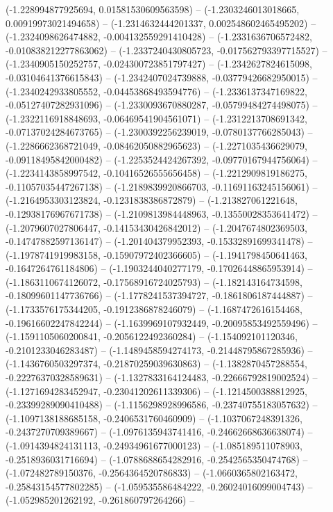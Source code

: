 \begin{scope}[blend group = overlay]
(-1.228994877925694, 0.01581530609563598) -- 
(-1.2303246013018665, 0.00919973021494658) -- 
(-1.2314632444201337, 0.002548602465495202) -- 
(-1.2324098626474882, -0.004132559291410428) -- 
(-1.2331636706572482, -0.010838212277863062) -- 
(-1.2337240430805723, -0.017562793397715527) -- 
(-1.2340905150252757, -0.024300723851797427) -- 
(-1.2342627824615098, -0.03104641376615843) -- 
(-1.2342407024739888, -0.03779426682950015) -- 
(-1.2340242933805552, -0.04453868493594776) -- 
(-1.2336137347169822, -0.05127407282931096) -- 
(-1.2330093670880287, -0.05799484274498075) -- 
(-1.2322116918848693, -0.06469541904561071) -- 
(-1.2312213708691342, -0.07137024284673765) -- 
(-1.2300392256239019, -0.0780137766285043) -- 
(-1.2286662368721049, -0.08462050882965623) -- 
(-1.2271035436629079, -0.09118495842000482) -- 
(-1.2253524424267392, -0.09770167944756064) -- 
(-1.2234143858997542, -0.10416526555656458) -- 
(-1.2212909819186275, -0.11057035447267138) -- 
(-1.2189839920866703, -0.11691163245156061) -- 
(-1.2164953303123824, -0.1231838386872879) -- 
(-1.213827061221648, -0.12938176967671738) -- 
(-1.2109813984448963, -0.13550028353641472) -- 
(-1.2079607027806447, -0.14153430426842012) -- 
(-1.2047674802369503, -0.14747882597136147) -- 
(-1.201404379952393, -0.15332891699341478) -- 
(-1.1978741919983158, -0.15907972402366605) -- 
(-1.1941798450641463, -0.1647264761184806) -- 
(-1.1903244040277179, -0.17026448865953914) -- 
(-1.1863110674126072, -0.17568916724025793) -- 
(-1.182143164734598, -0.18099601147736766) -- 
(-1.1778241537394727, -0.1861806187444887) -- 
(-1.1733576175344205, -0.1912386878246079) -- 
(-1.1687472616154468, -0.19616602247842244) -- 
(-1.1639969107932449, -0.20095853492559496) -- 
(-1.1591105060200841, -0.2056122492360284) -- 
(-1.154092101120346, -0.2101233046283487) -- 
(-1.1489458594274173, -0.21448795867285936) -- 
(-1.1436760503297374, -0.21870259039630863) -- 
(-1.1382870457288554, -0.22276370328589631) -- 
(-1.1327833164124483, -0.22666792819002524) -- 
(-1.1271694283452947, -0.23041202611339306) -- 
(-1.1214500388812925, -0.23399289090410488) -- 
(-1.1156298928996586, -0.23740755183057632) -- 
(-1.1097138188685158, -0.2406531760460909) -- 
(-1.1037067248391326, -0.2437270709389667) -- 
(-1.0976135943741416, -0.24662668636638074) -- 
(-1.0914394824131113, -0.24934961677000123) -- 
(-1.085189511078903, -0.2518936031716694) -- 
(-1.0788688654282916, -0.2542565350474768) -- 
(-1.072482789150376, -0.2564364520786833) -- 
(-1.0660365802163472, -0.25843154577802285) -- 
(-1.059535586484222, -0.26024016099004743) -- 
(-1.052985201262192, -0.261860797264266) -- 

\end{scope}
